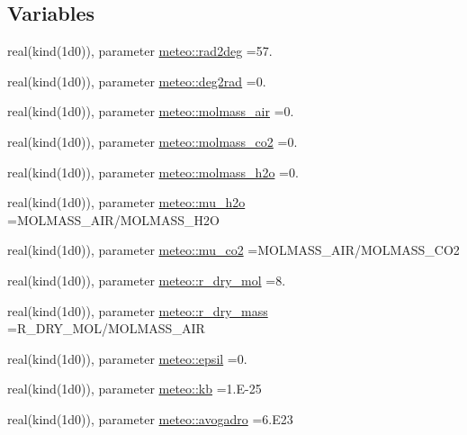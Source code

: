 \subsection*{Variables}
\begin{DoxyCompactItemize}
\item 
real(kind(1d0)), parameter \hyperlink{namespacemeteo_ae4e33b320117dc89986bd1d37a18ae74}{meteo\+::rad2deg} =57.
\item 
real(kind(1d0)), parameter \hyperlink{namespacemeteo_a6acb74c9a7ddfe85ba69112897754791}{meteo\+::deg2rad} =0.
\item 
real(kind(1d0)), parameter \hyperlink{namespacemeteo_a54b7cd84df1d97cb79965d43460ad694}{meteo\+::molmass\+\_\+air} =0.
\item 
real(kind(1d0)), parameter \hyperlink{namespacemeteo_acb7ea078c76c3b3d8eed2c1f1df3f6ba}{meteo\+::molmass\+\_\+co2} =0.
\item 
real(kind(1d0)), parameter \hyperlink{namespacemeteo_aae3f90f9d5c4581ccb0a05acee54f2ac}{meteo\+::molmass\+\_\+h2o} =0.
\item 
real(kind(1d0)), parameter \hyperlink{namespacemeteo_ac6780e7f2432c338fc92d3ef2eca5089}{meteo\+::mu\+\_\+h2o} =M\+O\+L\+M\+A\+S\+S\+\_\+\+A\+IR/M\+O\+L\+M\+A\+S\+S\+\_\+\+H2O
\item 
real(kind(1d0)), parameter \hyperlink{namespacemeteo_a5e25bc167da1551976c0f934a28b9c41}{meteo\+::mu\+\_\+co2} =M\+O\+L\+M\+A\+S\+S\+\_\+\+A\+IR/M\+O\+L\+M\+A\+S\+S\+\_\+\+C\+O2
\item 
real(kind(1d0)), parameter \hyperlink{namespacemeteo_a6b0124b140e3a372291310b9c292ceda}{meteo\+::r\+\_\+dry\+\_\+mol} =8.
\item 
real(kind(1d0)), parameter \hyperlink{namespacemeteo_aeb38e2ee75a5100806164ecfd458a956}{meteo\+::r\+\_\+dry\+\_\+mass} =R\+\_\+\+D\+R\+Y\+\_\+\+M\+OL/M\+O\+L\+M\+A\+S\+S\+\_\+\+A\+IR
\item 
real(kind(1d0)), parameter \hyperlink{namespacemeteo_a63de0dfce55a22ba48600ea13d0e216d}{meteo\+::epsil} =0.
\item 
real(kind(1d0)), parameter \hyperlink{namespacemeteo_a4ac27cf4384cebc39c7c0ec998ec5579}{meteo\+::kb} =1.\+E-\/25
\item 
real(kind(1d0)), parameter \hyperlink{namespacemeteo_aaf725e1853e17e82e0db242dcf619c15}{meteo\+::avogadro} =6.\+E23
\end{DoxyCompactItemize}
